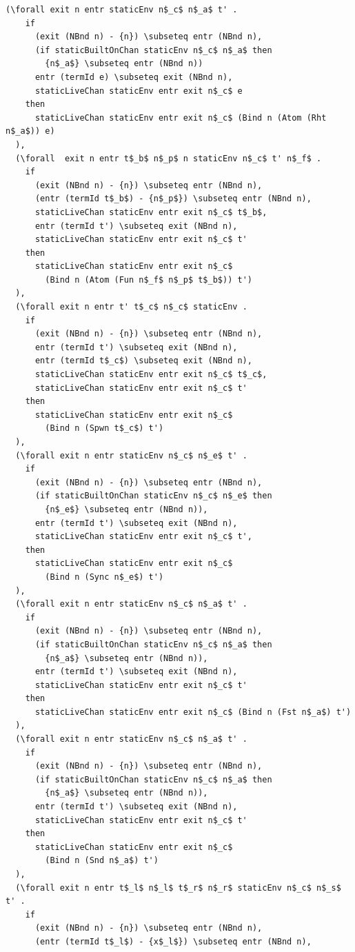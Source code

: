 \documentclass[10pt]{article}
\begin{document}
\begin{lstlisting}[language=logic, mathescape]
  (\forall exit n entr staticEnv n$_c$ n$_a$ t' . 
    if
      (exit (NBnd n) - {n}) \subseteq entr (NBnd n),
      (if staticBuiltOnChan staticEnv n$_c$ n$_a$ then
        {n$_a$} \subseteq entr (NBnd n))
      entr (termId e) \subseteq exit (NBnd n),
      staticLiveChan staticEnv entr exit n$_c$ e
    then
      staticLiveChan staticEnv entr exit n$_c$ (Bind n (Atom (Rht n$_a$)) e)
  ),
  (\forall  exit n entr t$_b$ n$_p$ n staticEnv n$_c$ t' n$_f$ . 
    if
      (exit (NBnd n) - {n}) \subseteq entr (NBnd n),
      (entr (termId t$_b$) - {n$_p$}) \subseteq entr (NBnd n),
      staticLiveChan staticEnv entr exit n$_c$ t$_b$,
      entr (termId t') \subseteq exit (NBnd n),
      staticLiveChan staticEnv entr exit n$_c$ t'
    then
      staticLiveChan staticEnv entr exit n$_c$
        (Bind n (Atom (Fun n$_f$ n$_p$ t$_b$)) t')
  ),
  (\forall exit n entr t' t$_c$ n$_c$ staticEnv .
    if
      (exit (NBnd n) - {n}) \subseteq entr (NBnd n),
      entr (termId t') \subseteq exit (NBnd n),
      entr (termId t$_c$) \subseteq exit (NBnd n),
      staticLiveChan staticEnv entr exit n$_c$ t$_c$,
      staticLiveChan staticEnv entr exit n$_c$ t'
    then
      staticLiveChan staticEnv entr exit n$_c$
        (Bind n (Spwn t$_c$) t')
  ),
  (\forall exit n entr staticEnv n$_c$ n$_e$ t' .
    if
      (exit (NBnd n) - {n}) \subseteq entr (NBnd n),
      (if staticBuiltOnChan staticEnv n$_c$ n$_e$ then
        {n$_e$} \subseteq entr (NBnd n)),
      entr (termId t') \subseteq exit (NBnd n),
      staticLiveChan staticEnv entr exit n$_c$ t',
    then
      staticLiveChan staticEnv entr exit n$_c$
        (Bind n (Sync n$_e$) t')
  ),
  (\forall exit n entr staticEnv n$_c$ n$_a$ t' .
    if
      (exit (NBnd n) - {n}) \subseteq entr (NBnd n),
      (if staticBuiltOnChan staticEnv n$_c$ n$_a$ then
        {n$_a$} \subseteq entr (NBnd n)),
      entr (termId t') \subseteq exit (NBnd n),
      staticLiveChan staticEnv entr exit n$_c$ t'
    then
      staticLiveChan staticEnv entr exit n$_c$ (Bind n (Fst n$_a$) t')
  ),
  (\forall exit n entr staticEnv n$_c$ n$_a$ t' .
    if 
      (exit (NBnd n) - {n}) \subseteq entr (NBnd n),
      (if staticBuiltOnChan staticEnv n$_c$ n$_a$ then
        {n$_a$} \subseteq entr (NBnd n)),
      entr (termId t') \subseteq exit (NBnd n),
      staticLiveChan staticEnv entr exit n$_c$ t'
    then
      staticLiveChan staticEnv entr exit n$_c$
        (Bind n (Snd n$_a$) t')
  ),
  (\forall exit n entr t$_l$ n$_l$ t$_r$ n$_r$ staticEnv n$_c$ n$_s$ t' .
    if 
      (exit (NBnd n) - {n}) \subseteq entr (NBnd n),
      (entr (termId t$_l$) - {x$_l$}) \subseteq entr (NBnd n),

\end{lstlisting}
\end{document}

